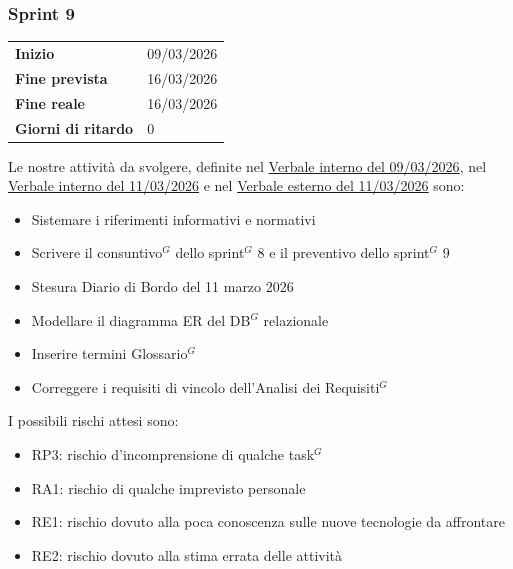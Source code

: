 \subsubsection{Sprint 9}


\begin{tabular}{p{} p{}}
	\textbf{Inizio} & 09/03/2026 \\
	\textbf{Fine prevista} & 16/03/2026 \\
	\textbf{Fine reale} & 16/03/2026 \\
	\textbf{Giorni di ritardo} & 0
\end{tabular}
\newline \newline 
Le nostre attività da svolgere, definite nel \href{https://nullpointersgroup.github.io/Documentazione/output/PB/Verbali%20Interni/2026-03-09_verbale_interno.pdf}{Verbale interno del 09/03/2026}, nel \href{https://nullpointersgroup.github.io/Documentazione/output/PB/Verbali%20Interni/2026-03-11_verbale_interno.pdf}{Verbale interno del 11/03/2026} e nel \href{https://nullpointersgroup.github.io/Documentazione/output/PB/Verbali%20Esterni/2026-03-11_verbale_esterno.pdf}{Verbale esterno del 11/03/2026} sono:
\begin{itemize}[itemsep=5pt, parsep=1pt, label=$\scriptstyle\bullet$]
	\item Sistemare i riferimenti informativi e normativi
	\item Scrivere il consuntivo$^G$ dello sprint$^G$ 8 e il preventivo dello sprint$^G$ 9
	\item Stesura Diario di Bordo del 11 marzo 2026
	\item Modellare il diagramma ER del DB$^G$ relazionale
	\item Inserire termini Glossario$^G$
	\item Correggere i requisiti di vincolo dell'Analisi dei Requisiti$^G$
\end{itemize}

I possibili rischi attesi sono:
\begin{itemize}[itemsep=5pt, parsep=1pt, label=$\scriptstyle\bullet$]
	\item RP3: rischio d'incomprensione di qualche task$^G$
	\item RA1: rischio di qualche imprevisto personale
	\item RE1: rischio dovuto alla poca conoscenza sulle nuove tecnologie da affrontare
	\item RE2: rischio dovuto alla stima errata delle attività
\end{itemize}

